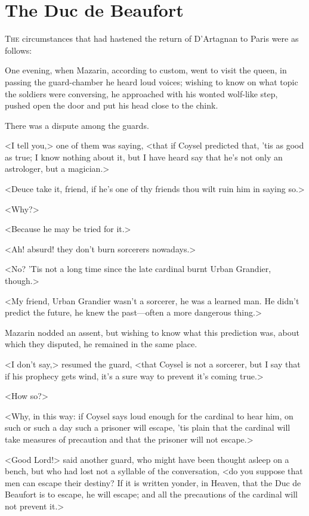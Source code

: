 \chapter{The Duc de Beaufort}

 \lettrine{T}{he} circumstances that had hastened the return of D'Artagnan to Paris were as follows:

\zz
One evening, when Mazarin, according to custom, went to visit the queen, in passing the guard-chamber he heard loud voices; wishing to know on what topic the soldiers were conversing, he approached with his wonted wolf-like step, pushed open the door and put his head close to the chink.

There was a dispute among the guards.

<I tell you,> one of them was saying, <that if Coysel predicted that, 'tis as good as true; I know nothing about it, but I have heard say that he's not only an astrologer, but a magician.>

<Deuce take it, friend, if he's one of thy friends thou wilt ruin him in saying so.>

<Why?>

<Because he may be tried for it.>

<Ah! absurd! they don't burn sorcerers nowadays.>

<No? 'Tis not a long time since the late cardinal burnt Urban Grandier, though.>

<My friend, Urban Grandier wasn't a sorcerer, he was a learned man. He didn't predict the future, he knew the past—often a more dangerous thing.>

Mazarin nodded an assent, but wishing to know what this prediction was, about which they disputed, he remained in the same place.

<I don't say,> resumed the guard, <that Coysel is not a sorcerer, but I say that if his prophecy gets wind, it's a sure way to prevent it's coming true.>

<How so?>

<Why, in this way: if Coysel says loud enough for the cardinal to hear him, on such or such a day such a prisoner will escape, 'tis plain that the cardinal will take measures of precaution and that the prisoner will not escape.>

<Good Lord!> said another guard, who might have been thought asleep on a bench, but who had lost not a syllable of the conversation, <do you suppose that men can escape their destiny? If it is written yonder, in Heaven, that the Duc de Beaufort is to escape, he will escape; and all the precautions of the cardinal will not prevent it.>

